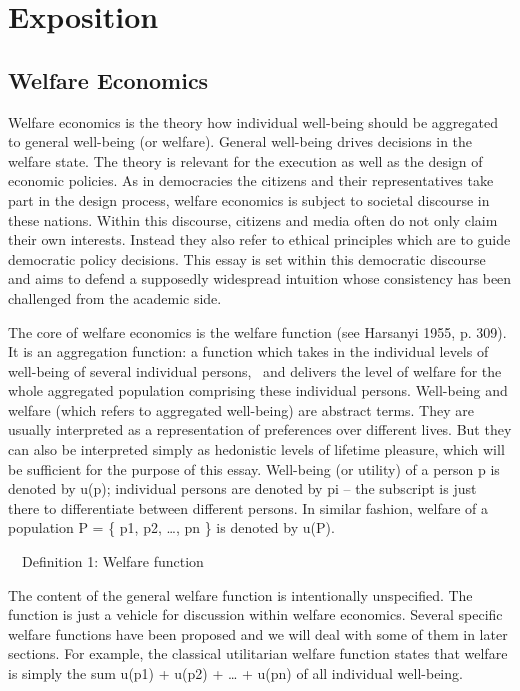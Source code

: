 \chapter{Exposition}
\section{Welfare Economics}

Welfare economics is the theory how individual well-being should be aggregated to general well-being (or welfare). General well-being drives decisions in the welfare state. The theory is relevant for the execution as well as the design of economic policies. As in democracies the citizens and their representatives take part in the design process, welfare economics is subject to societal discourse in these nations. Within this discourse, citizens and media often do not only claim their own interests. Instead they also refer to ethical principles which are to guide democratic policy decisions. This essay is set within this democratic discourse and aims to defend a supposedly widespread intuition whose consistency has been challenged from the academic side.  

The core of welfare economics is the welfare function (see \label{ref:RNDwEYvso2F3F}Harsanyi 1955, p. 309). It is an aggregation function: a function which takes in the individual levels of well-being of several individual persons, \ and delivers the level of welfare for the whole aggregated population comprising these individual persons. Well-being and welfare (which refers to aggregated well-being) are abstract terms. They are usually interpreted as a representation of preferences over different lives. But they can also be interpreted simply as hedonistic levels of lifetime pleasure, which will be sufficient for the purpose of this essay. Well-being (or utility) of a person p is denoted by u(p); individual persons are denoted by pi – the subscript is just there to differentiate between different persons. In similar fashion, welfare of a population P = \{ p1, p2, …, pn \} is denoted by u(P). 

\ \ Definition 1: Welfare function 
\begin{comment}
\ \ w: \ \ [D835?][DCDF?]($\mathbb{R}$+) \ding{213} $\mathbb{R}$+, \ \ \ \ \{ u(p1), u(p2), …, u(pn) \} \ \ $\mapsto $ \ \ u( \{ p1, p2, …, pn \} ) 
\end{comment}

The content of the general welfare function is intentionally unspecified. The function is just a vehicle for discussion within welfare economics. Several specific welfare functions have been proposed and we will deal with some of them in later sections. For example, the classical utilitarian welfare function states that welfare is simply the sum u(p1) + u(p2) + … + u(pn) of all individual well-being.  

